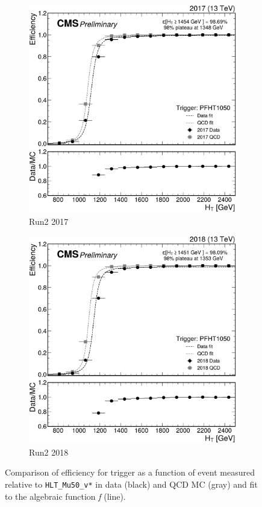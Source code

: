 \begin{figure}
	\begin{subfigure}{.45\textwidth}
		\includegraphics[width=\linewidth]{Images/pdfs/17_efficiency_withratio_and_fits.pdf}
		\caption{Run2 2017}
		\label{fig:HT_eff_17}
	\end{subfigure}
	\begin{subfigure}{.45\textwidth}
		\includegraphics[width=\linewidth]{Images/pdfs/18_efficiency_withratio_and_fits.pdf}
		\caption{Run2 2018}
		\label{fig:HT_eff_18}
	\end{subfigure}
	\caption[Comparison of trigger efficiencies for \HT trigger]{Comparison of efficiency for \HT trigger as a function of event \HT measured relative to \texttt{HLT\_Mu50\_v*} in data (black) and QCD MC (gray) and fit to the algebraic function \textit{f} (line).}
	\label{fig:HT_efficiencies}
\end{figure}

